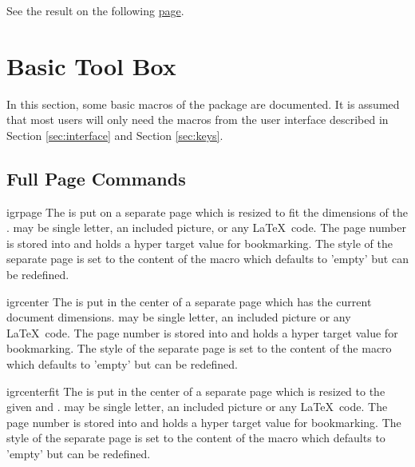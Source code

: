 \documentclass[a4paper,11pt]{ltxdoc}
\newcounter{texexp}
\newcommand{\inputlisting}[1]{}
\newcommand{\inputlastlisting}{\inputlisting{\thetexexp}}
\begin{document}
See the result on the following \hyperlink{mytarget}{page}.
\clearpage\inputlastlisting





\section{Basic Tool Box}\label{sec:basictoolbox}
In this section, some basic macros of the package are documented.
It is assumed that most users will only need the macros from the
user interface described in Section \ref{sec:interface} and Section \ref{sec:keys}.


\subsection{Full Page Commands}

\begin{docCommand}{igrpage}{}
  The  is put on a separate page which is resized to fit the
  dimensions of the .  may be single letter, an
  included picture, or any \LaTeX\ code.
  The page number is stored into  and
   holds a hyper target value for bookmarking.
  The style of the separate page is set to
  the content of the macro
   which defaults to 'empty' but can be
  redefined.
\end{docCommand}

\begin{docCommand}{igrcenter}{}
  The  is put in the center of a separate page which has the
  current document dimensions.  may be single letter, an
  included picture or any \LaTeX\ code.
  The page number is stored into  and
   holds a hyper target value for bookmarking.
  The style of the separate page is set to
  the content of the macro
   which defaults to 'empty' but can be
  redefined.
\end{docCommand}

\begin{docCommand}{igrcenterfit}{}
  The  is put in the center of a separate page which
  is resized to the given  and .
   may be single letter, an
  included picture or any \LaTeX\ code.
  The page number is stored into  and
   holds a hyper target value for bookmarking.
  The style of the separate page is set to
  the content of the macro
   which defaults to 'empty' but can be
  redefined.
\end{docCommand}
\end{document}
